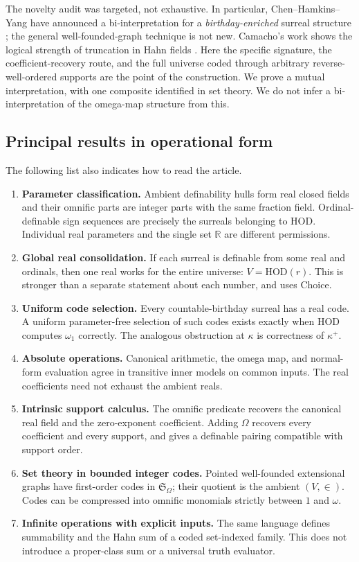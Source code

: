 \documentclass[11pt,a4paper]{article}
\numberwithin{equation}{section}
\theoremstyle{definition}
\theoremstyle{remark}
\newcommand{\HOD}{\mathrm{HOD}}
\newcommand{\R}{\mathbb R}
\newcommand{\Somega}{\mathfrak S_\Omega}
\begin{document}
The novelty audit was targeted, not exhaustive.  In particular,
Chen--Hamkins--Yang have announced a bi-interpretation for a
\emph{birthday-enriched} surreal structure \cite{CHYKobe}; the general
well-founded-graph technique is not new.  Camacho's work shows the logical
strength of truncation in Hahn fields \cite{Camacho}.  Here the specific
signature, the coefficient-recovery route, and the full universe coded
through arbitrary reverse-well-ordered supports are the point of the
construction.  We prove a mutual interpretation, with one composite
identified in set theory.  We do not infer a bi-interpretation of the
omega-map structure from this.

\subsection{Principal results in operational form}

The following list also indicates how to read the article.
\begin{enumerate}
\item \textbf{Parameter classification.} Ambient definability hulls form
real closed fields and their omnific parts are integer parts with the same
fraction field.  Ordinal-definable sign sequences are precisely the
surreals belonging to HOD.  Individual real parameters and the single set
\(\R\) are different permissions.
\item \textbf{Global real consolidation.} If each surreal is definable
from some real and ordinals, then one real works for the entire universe:
\(V=\HOD(r)\).  This is stronger than a separate statement about each
number, and uses Choice.
\item \textbf{Uniform code selection.} Every countable-birthday surreal
has a real code.  A uniform parameter-free selection of such codes exists
exactly when HOD computes \(\omega_1\) correctly.  The analogous obstruction
at \(\kappa\) is correctness of \(\kappa^+\).
\item \textbf{Absolute operations.} Canonical arithmetic, the omega map,
and normal-form evaluation agree in transitive inner models on common
inputs.  The real coefficients need not exhaust the ambient reals.
\item \textbf{Intrinsic support calculus.} The omnific predicate recovers
the canonical real field and the zero-exponent coefficient.  Adding
\(\Omega\) recovers every coefficient and every support, and gives a
definable pairing compatible with support order.
\item \textbf{Set theory in bounded integer codes.} Pointed well-founded
extensional graphs have first-order codes in \(\Somega\); their quotient
is the ambient \((V,\in)\).  Codes can be compressed into omnific
monomials strictly between \(1\) and \(\omega\).
\item \textbf{Infinite operations with explicit inputs.} The same
language defines summability and the Hahn sum of a coded set-indexed
family.  This does not introduce a proper-class sum or a universal truth
evaluator.
\end{enumerate}
\end{document}
